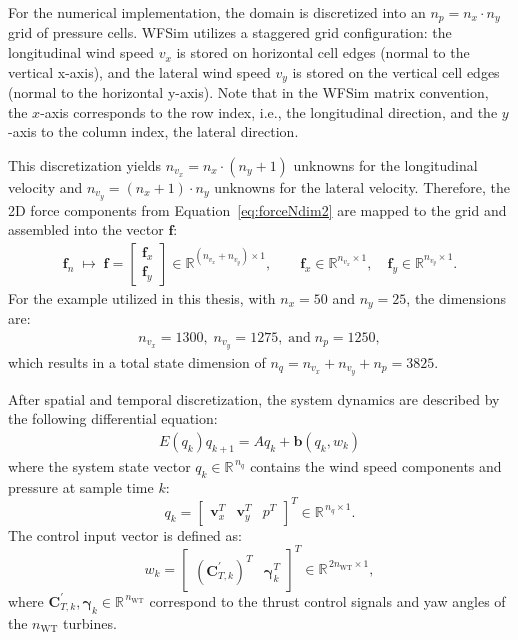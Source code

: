 For the numerical implementation, the domain is discretized into an $n_p = n_x \cdot n_y$ grid of pressure cells. WFSim utilizes a staggered grid configuration: the longitudinal wind speed $v_x$ is stored on horizontal cell edges (normal to the vertical x-axis), and the lateral wind speed $v_y$ is stored on the vertical cell edges (normal to the horizontal y-axis). Note that in the WFSim matrix convention, the $x$-axis corresponds to the row index, i.e., the longitudinal direction, and the $y$-axis to the column index, the lateral direction.

This discretization yields $n_{v_x} = n_x \cdot (n_y+1)$ unknowns for the longitudinal velocity and $n_{v_y} = (n_x+1) \cdot n_y$ unknowns for the lateral velocity. Therefore, the 2D force components from Equation~\eqref{eq:forceNdim2} are mapped to the grid and assembled into the vector $\bm{f}$:
\begin{align}\label{eq:forceWFSim}
    \bm{f}_n \;\mapsto\; \bm{f} =
    \begin{bmatrix}
        \bm{f}_{x} \\[1mm]
        \bm{f}_{y}
    \end{bmatrix} \in \mathbb{R}^{(n_{v_x}+n_{v_y}) \times 1}, 
    \qquad 
    \bm{f}_{x} \in \mathbb{R}^{n_{v_x} \times 1}, \quad
    \bm{f}_{y} \in \mathbb{R}^{n_{v_y} \times 1}.
\end{align}
For the example utilized in this thesis, with $n_x = 50$ and $n_y = 25$, the dimensions are:
\begin{align*}
    n_{v_x} = 1300,\;  n_{v_y} = 1275, \;\text{and}\; n_{p} = 1250,
\end{align*}
which results in a total state dimension of $n_q = n_{v_x} + n_{v_y} + n_p = 3825$.

After spatial and temporal discretization, the system dynamics are described by the following differential equation:
\begin{align} \label{eq:WfsinGrid}
    E(q_k)q_{k+1} = Aq_k + \bm{b}(q_k, w_k)
\end{align}
where the system state vector $q_k \in \mathbb{R}^{\,n_q}$ contains the wind speed components and pressure at sample time $k$:
\[
q_k = 
\begin{bmatrix} 
    \bm{v}_x^T   & \bm{v}_y^T   & p^T   
\end{bmatrix}^T \in \mathbb{R}^{\,n_{q} \times 1}.
\]
The control input vector is defined as:
\[
w_k = 
\begin{bmatrix} 
    (\bm{C}_{T,k}^{\prime})^T   & \bm{\gamma}_k^T   
\end{bmatrix}^T   
\in \mathbb{R}^{\,2n_{\mathrm{WT}}\times 1},
\]
where $\bm{C}_{T,k}^{\prime}, \bm{\gamma}_k \in \mathbb{R}^{\,n_{\mathrm{WT}}}$ correspond to the thrust control signals and yaw angles of the $n_{\mathrm{WT}}$ turbines.

